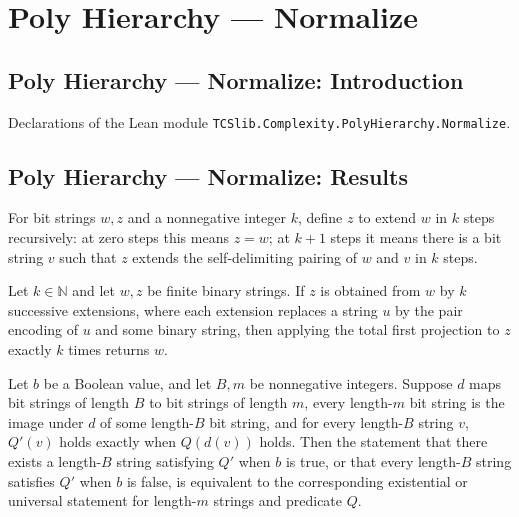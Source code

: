 \section{Poly Hierarchy --- Normalize}
\subsection*{Poly Hierarchy --- Normalize: Introduction}

Declarations of the Lean module \texttt{TCSlib.Complexity.PolyHierarchy.Normalize}.

\subsection*{Poly Hierarchy --- Normalize: Results}

\begin{definition}
\label{Complexity.PolyHierarchy.Extends}
\leanok
{}
For bit strings $w,z$ and a nonnegative integer $k$, define $z$ to extend $w$ in $k$
steps recursively: at zero steps this means $z=w$; at $k+1$ steps it means there is a
bit string $v$ such that $z$ extends the self-delimiting pairing of $w$ and $v$ in $k$
steps.
\end{definition}

\begin{theorem}
\label{Complexity.PolyHierarchy.Extends.iterate_pairFstD}
\leanok
{}
Let $k\in\mathbb{N}$ and let $w,z$ be finite binary strings. If $z$ is obtained from $w$
by $k$ successive extensions, where each extension replaces a string $u$ by the pair
encoding of $u$ and some binary string, then applying the total first projection to $z$
exactly $k$ times returns $w$.
\end{theorem}

\begin{theorem}
\label{Complexity.PolyHierarchy.qStep_transfer}
\leanok
{}
Let $b$ be a Boolean value, and let $B,m$ be nonnegative integers. Suppose $d$ maps bit
strings of length $B$ to bit strings of length $m$, every length-$m$ bit string is the
image under $d$ of some length-$B$ bit string, and for every length-$B$ string $v$,
$Q'(v)$ holds exactly when $Q(d(v))$ holds. Then the statement that there exists a
length-$B$ string satisfying $Q'$ when $b$ is true, or that every length-$B$ string
satisfies $Q'$ when $b$ is false, is equivalent to the corresponding existential or
universal statement for length-$m$ strings and predicate $Q$.
\end{theorem}

